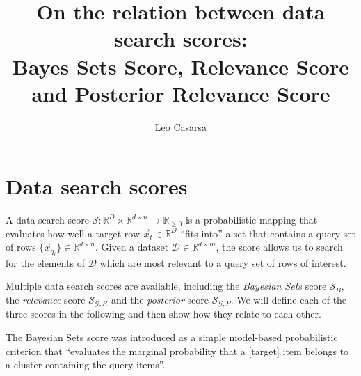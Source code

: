\documentclass{article}
\newcommand{\set}[1]{\{{#1}\}}
\theoremstyle{break}
\begin{document}
\title{On the relation between data search scores: \\
  Bayes Sets Score, Relevance Score and Posterior Relevance Score}
\author{Leo Casarsa}
\maketitle

\section{Data search scores}

  \newcommand{\mS}{\mathcal{S}}
  \newcommand{\target}{\vec x_t}
  \newcommand{\queryset}{\set{\vec x_{q_i}}}
  \newcommand{\Rd}{\mathbb{R}^D}
  \newcommand{\Rdn}{\mathbb{R}^{d \times n}}
  \newcommand{\Rp}{\mathbb{R}_{\geq 0}}
  \newcommand{\Rdr}{\mathbb{R}^{d \times m}}
  \newcommand{\mD}{\mathcal{D}}
  \newcommand{\mG}{\mathcal{G}}
  \newcommand{\hypers}{\vec \lambda}
  \newcommand{\params}{\vec \theta}
  \newcommand{\yt}{y_t}
  \newcommand{\yi}{y_i}
  \newcommand{\sameyq}{y_{q_1}=\ldots=y_{q_n}}
  \newcommand{\yqset}{\set{y_{q_i}}}
  \newcommand{\rscore}{\mS_{\mG, R}}
  \newcommand{\sstats}{\text{T}}
  \newcommand{\crp}{\textsc{CRP}}

    A data search score $\mS: \Rd \times \Rdn \rightarrow \Rp$ is a
    probabilistic mapping that evaluates how well a target row
    $\target \in \Rd$ ``fits into'' a set that contains a
    query set of rows $\queryset \in \Rdn$. Given a dataset $\mD \in \Rdr$, the
    score allows us to search for the elements of $\mD$ which are most relevant
    to a query set of rows of interest.

    Multiple data search scores are available, including the
    \emph{Bayesian Sets} score $\mS_B$, the \emph{relevance} score $\rscore$ and
    the \emph{posterior} score $\mS_{\mG,P}$. We will define each of the three scores
    in the following and then show how they relate to each other.

    The Bayesian Sets score was introduced as a simple model-based probabilistic
    criterion that ``evaluates the marginal probability that a [target] item
    belongs to a cluster containing the query items''. 
   
\end{document}
